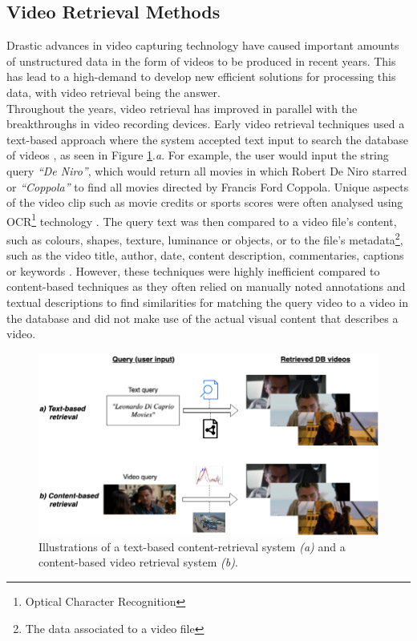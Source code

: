 \subsection{Video Retrieval Methods}
\label{sec:cbvr-methods}

Drastic advances in video capturing technology have caused important amounts of unstructured data in the form of videos to be produced in recent years. This has lead to a high-demand to develop new efficient solutions for processing this data, with video retrieval being the answer.\\

Throughout the years, video retrieval has improved in parallel with the breakthroughs in video recording devices. Early video retrieval techniques used a text-based approach where the system accepted text input to search the database of videos \cite{lai2015trajectory}, as seen in Figure \ref{fig:text_vs_content_retrieval}.\emph{a}. For example, the user would input the string query \textit{``De Niro''}, which would return all movies in which Robert De Niro starred or \textit{``Coppola''} to find all movies directed by Francis Ford Coppola. Unique aspects of the video clip such as movie credits or sports scores were often analysed using OCR\footnote{Optical Character Recognition} technology \cite{li2002text}. The query text was then compared to a video file's content, such as colours, shapes, texture, luminance or objects, or to the file's metadata\footnote{The data associated to a video file}, such as the video title, author, date, content description, commentaries, captions or keywords \cite{li2002text} \cite{feng2011} \cite{patel2012}. However, these techniques were highly inefficient compared to content-based techniques as they often relied on manually noted annotations and textual descriptions to find similarities for matching the query video to a video in the database and did not make use of the actual visual content that describes a video.\\

\begin{figure}[h]
\centerline{\includegraphics[width=\textwidth]{figures/litsurvey/content_text-retrieval_comparison.png}}
\caption{\label{fig:text_vs_content_retrieval}Illustrations of a text-based content-retrieval system \emph{(a)} and a content-based video retrieval system \emph{(b)}.}
\end{figure}

